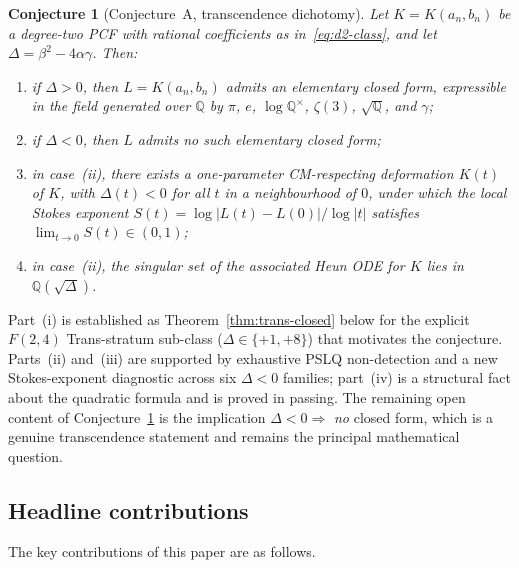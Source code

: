 \documentclass[11pt,reqno]{amsart}
\newtheorem{conjecture}[theorem]{Conjecture}
\theoremstyle{definition}
\begin{document}
\begin{conjecture}[Conjecture~A, transcendence dichotomy]
\label{conj:A-intro}
Let $K = K(a_{n},b_{n})$ be a degree-two PCF with rational
coefficients as in~\eqref{eq:d2-class}, and let
$\Delta=\beta^{2}-4\alpha\gamma$. Then:
\begin{enumerate}
\item[(i)] if $\Delta>0$, then $L = K(a_{n},b_{n})$ admits an
elementary closed form, expressible in the field generated over
$\mathbb{Q}$ by $\pi$, $e$, $\log\mathbb{Q}^{\times}$,
$\zeta(3)$, $\sqrt{\mathbb{Q}}$, and $\gamma$;
\item[(ii)] if $\Delta<0$, then $L$ admits no such elementary
closed form;
\item[(iii)] in case~(ii), there exists a one-parameter
CM-respecting deformation $K(t)$ of $K$, with $\Delta(t)<0$ for
all $t$ in a neighbourhood of $0$, under which the local
Stokes exponent
$S(t) = \log|L(t)-L(0)|/\log|t|$ satisfies
$\lim_{t\to 0} S(t) \in (0,1)$;
\item[(iv)] in case~(ii), the singular set of the associated
Heun ODE for $K$ lies in $\mathbb{Q}(\sqrt{\Delta})$.
\end{enumerate}
\end{conjecture}

Part~(i) is established as Theorem~\ref{thm:trans-closed} below
for the explicit $F(2,4)$ Trans-stratum sub-class
($\Delta\in\{+1,+8\}$) that motivates the conjecture. Parts~(ii)
and~(iii) are supported by exhaustive PSLQ non-detection and a
new Stokes-exponent diagnostic across six $\Delta<0$ families;
part~(iv) is a structural fact about the quadratic formula and
is proved in passing. The remaining open content of
Conjecture~\ref{conj:A-intro} is the implication
$\Delta<0 \Rightarrow$ \emph{no} closed form, which is a
genuine transcendence statement and remains the principal
mathematical question.

\subsection{Headline contributions}\label{ssec:headline}

The key contributions of this paper are as follows.
\end{document}
